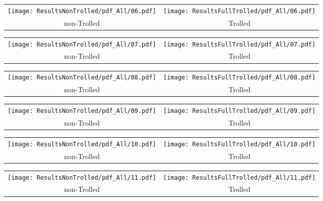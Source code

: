 \begin{tabular}{cc}
{  \texttt{[image: ResultsNonTrolled/pdf\_All/06.pdf]} } & 
{  \texttt{[image: ResultsFullTrolled/pdf\_All/06.pdf]}} \\
 non-Trolled & Trolled \\
\end{tabular}

\begin{tabular}{cc}
{  \texttt{[image: ResultsNonTrolled/pdf\_All/07.pdf]} } & 
{  \texttt{[image: ResultsFullTrolled/pdf\_All/07.pdf]}} \\
 non-Trolled & Trolled \\
\end{tabular}

\begin{tabular}{cc}
{  \texttt{[image: ResultsNonTrolled/pdf\_All/08.pdf]} } & 
{  \texttt{[image: ResultsFullTrolled/pdf\_All/08.pdf]}} \\
 non-Trolled & Trolled \\
\end{tabular}

\begin{tabular}{cc}
{  \texttt{[image: ResultsNonTrolled/pdf\_All/09.pdf]} } & 
{  \texttt{[image: ResultsFullTrolled/pdf\_All/09.pdf]}} \\
 non-Trolled & Trolled \\
\end{tabular}

\begin{tabular}{cc}
{  \texttt{[image: ResultsNonTrolled/pdf\_All/10.pdf]} } & 
{  \texttt{[image: ResultsFullTrolled/pdf\_All/10.pdf]}} \\
 non-Trolled & Trolled \\
\end{tabular}

\begin{tabular}{cc}
{  \texttt{[image: ResultsNonTrolled/pdf\_All/11.pdf]} } & 
{  \texttt{[image: ResultsFullTrolled/pdf\_All/11.pdf]}} \\
 non-Trolled & Trolled \\
\end{tabular}

